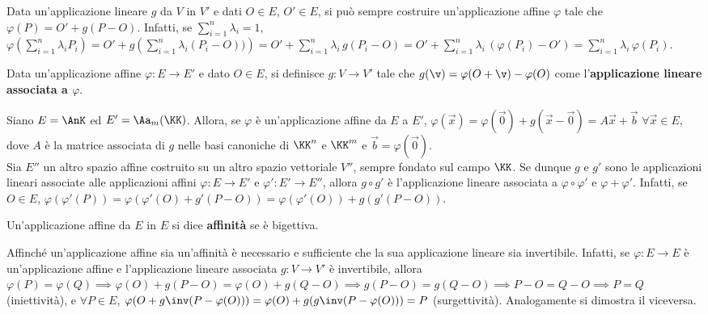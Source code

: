 \documentclass[11pt]{article}
\begin{document}
	\begin{remark}
		Data un'applicazione lineare $g$ da $V$ in $V'$ e dati $O \in E$, $O' \in E$, si può sempre costruire un'applicazione affine $\varphi$ tale che $\varphi(P) = O' + g(P - O)$. Infatti, se $\sum_{i=1}^n \lambda_i = 1$,
		$\varphi\left( \sum_{i=1}^n \lambda_i P_i \right) = O' + g\left( \sum_{i=1}^n \lambda_i (P_i - O) ) \right) =
		O' + \sum_{i=1}^n \lambda_i \, g(P_i - O) = O' + \sum_{i=1}^n \lambda_i \, (\varphi(P_i) - O') = \sum_{i=1}^n \lambda_i \, \varphi(P_i)$.
	\end{remark}
	
	\begin{definition} 
		Data un'applicazione affine $\varphi : E \to E'$ e dato $O \in E$, si definisce $g : V \to V'$ tale che
		$g(\v) = \varphi(O + \v) - \varphi(O)$ come l'\textbf{applicazione lineare associata a $\varphi$}.
	\end{definition}
	
	\begin{remark}\nl
		\li Siano $E = \AnK$ ed $E' = \Aa_m(\KK)$. Allora, se $\varphi$ è un'applicazione affine da $E$ a $E'$,
		$\varphi(\vec x) = \varphi(\vec 0) + g(\vec x - \vec 0) = A \vec x + \vec b$ $\forall \vec x \in E$, dove $A$ è la matrice associata
		di $g$ nelle basi canoniche di $\KK^n$ e $\KK^m$ e $\vec b = \varphi(\vec 0)$. \\

		\li Sia $E''$ un altro spazio affine costruito su un altro spazio
		vettoriale $V''$, sempre fondato sul campo $\KK$. Se dunque $g$ e $g'$ sono le applicazioni lineari associate alle applicazioni affini $\varphi : E \to E'$ e $\varphi' : E' \to E''$,
		allora $g \circ g'$ è l'applicazione lineare associata a $\varphi \circ \varphi'$ e
		$\varphi + \varphi'$. Infatti, se $O \in E$, $\varphi(\varphi'(P)) = \varphi(\varphi'(O) + g'(P-O)) =
		\varphi(\varphi'(O)) + g(g'(P-O))$.
	\end{remark}
	
	\begin{definition} [affinità] Un'applicazione affine da $E$ in $E$ si dice \textbf{affinità} se è bigettiva.
	\end{definition}
	
	\begin{remark}
		Affinché un'applicazione affine sia un'affinità è necessario e sufficiente che la sua applicazione
		lineare sia invertibile. Infatti, se $\varphi : E \to E$ è un'applicazione affine e l'applicazione
		lineare associata $g : V \to V'$ è invertibile, allora $\varphi(P) = \varphi(Q) \implies \varphi(O) + g(P - O) = \varphi(O) + g(Q - O) \implies g(P-O) = g(Q-O) \implies P-O = Q-O \implies P=Q$ (iniettività), e $\forall P \in E$,
		$\varphi(O + g\inv(P-\varphi(O))) = \varphi(O) + g(g\inv(P-\varphi(O))) = P$ (surgettività). Analogamente
		si dimostra il viceversa.
	\end{remark}
\end{document}
